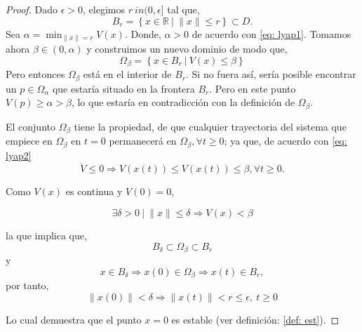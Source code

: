 \begin{proof}
Dado $\epsilon > 0$, elegimos $r \ in (0,\epsilon]$ tal que,
\begin{equation*}
B_r = \left\{ x \in \mathbb{R} \ |\  \|x\| \leq r \right\} \subset D.
\end{equation*}
Sea $\alpha =  \min_{\|x\| = r}V(x)$. Donde, $\alpha >0$ de acuerdo con \ref{eq: lyap1}. Tomamos ahora $\beta \in (0,\alpha)$ y construimos un nuevo dominio de modo que,
\begin{equation*}
\Omega_\beta = \left\{ x \in B_r \ |\  V(x) \leq \beta \right\}
\end{equation*}
Pero entonces $\Omega_\beta$ está en el interior de $B_r$.  Si no fuera así, sería posible encontrar un $p \in \Omega_\alpha$ que estaría situado en la frontera $B_r$. Pero en este punto $V(p) \ge \alpha > \beta$, lo que estaría en contradicción con la definición de $\Omega_\beta$. 

El conjunto $\Omega_\beta$ tiene la propiedad, de que cualquier trayectoria del sistema que empiece en $\Omega_\beta$  en $t=0$ permanecerá en $\Omega_\beta, \forall t \geq 0$; ya que, de acuerdo con \ref{eq: lyap2}
\begin{equation*}
\dot V \leq 0 \Rightarrow V(x(t)) \leq V(x(t)) \leq \beta, \forall t \geq 0.
\end{equation*}

Como $V(x)$ es continua y $V(0) = 0$,

\begin{equation*}
\exists \delta > 0\  |\  \|x\| \leq \delta \Rightarrow V(x) < \beta
\end {equation*}

la que implica que,
\begin{equation}
B_\delta \subset \Omega_\beta \subset B_r
\end{equation}
y
\begin{equation*}
x \in B_\delta \Rightarrow x(0) \in \Omega_\beta \Rightarrow x(t) \in B_r,
\end{equation*}
por tanto,
\begin{equation*}
\|x(0)\| < \delta \Rightarrow \|x(t)\|<r \leq \epsilon, \ t \geq 0
\end{equation*}

Lo cual demuestra que el punto $x=0$ es estable (ver definición: \ref{def: est}). 


\end{proof}
